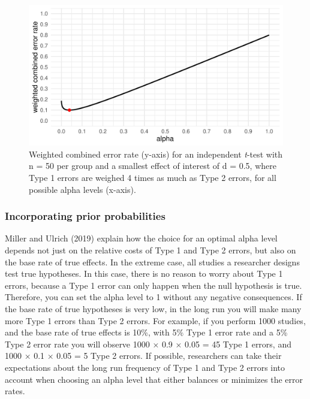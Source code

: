 \documentclass[,jou,floatsintext]{apa6}
\begin{document}
\begin{figure}
\centering
\includegraphics{Justify_in_Practice_files/figure-latex/cost-plot-1.pdf}
\caption{\label{fig:cost-plot}Weighted combined error rate (y-axis) for an independent \emph{t}-test with n = 50 per group and a smallest effect of interest of d = 0.5, where Type 1 errors are weighed 4 times as much as Type 2 errors, for all possible alpha levels (x-axis).}
\end{figure}

\hypertarget{incorporating-prior-probabilities}{%
\subsubsection{Incorporating prior probabilities}\label{incorporating-prior-probabilities}}

Miller and Ulrich (2019) explain how the choice for an optimal alpha level depends not just on the relative costs of Type 1 and Type 2 errors, but also on the base rate of true effects. In the extreme case, all studies a researcher designs test true hypotheses. In this case, there is no reason to worry about Type 1 errors, because a Type 1 error can only happen when the null hypothesis is true. Therefore, you can set the alpha level to 1 without any negative consequences. If the base rate of true hypotheses is very low, in the long run you will make many more Type 1 errors than Type 2 errors. For example, if you perform 1000 studies, and the base rate of true effects is 10\%, with 5\% Type 1 error rate and a 5\% Type 2 error rate you will observe 1000 × 0.9 × 0.05 = 45 Type 1 errors, and 1000 × 0.1 × 0.05 = 5 Type 2 errors. If possible, researchers can take their expectations about the long run frequency of Type 1 and Type 2 errors into account when choosing an alpha level that either balances or minimizes the error rates.
\end{document}
